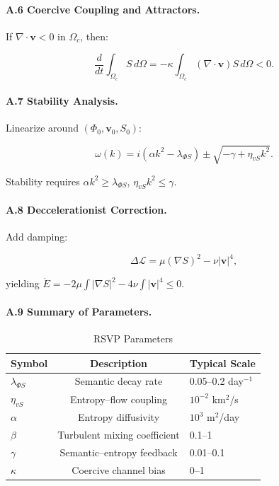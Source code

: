 \documentclass[12pt]{article}
\begin{document}
\paragraph{A.6 Coercive Coupling and Attractors.}

If \(\nabla \cdot \mathbf{v} < 0\) in \(\Omega_c\), then:

\[
\frac{d}{dt} \int_{\Omega_c} S \, d\Omega = -\kappa \int_{\Omega_c} (\nabla \cdot \mathbf{v}) S \, d\Omega < 0.
\]

\paragraph{A.7 Stability Analysis.}

Linearize around \((\Phi_0, \mathbf{v}_0, S_0)\):

\[
\omega(k) = i (\alpha k^2 - \lambda_{\Phi S}) \pm \sqrt{-\gamma + \eta_{vS} k^2}.
\]

Stability requires \(\alpha k^2 \geq \lambda_{\Phi S}\), \(\eta_{vS} k^2 \leq \gamma\).

\paragraph{A.8 Deccelerationist Correction.}

Add damping:

\[
\Delta \mathcal{L} = \mu (\nabla S)^2 - \nu |\mathbf{v}|^4,
\]

yielding \(\dot{E} = -2 \mu \int |\nabla S|^2 - 4 \nu \int |\mathbf{v}|^4 \leq 0\).

\paragraph{A.9 Summary of Parameters.}

\begin{table}[h]
\caption{RSVP Parameters}
\begin{center}
\begin{tabular}{lcl}
\toprule
Symbol & Description & Typical Scale \\
\midrule
\(\lambda_{\Phi S}\) & Semantic decay rate & 0.05–0.2 day\(^{-1}\) \\
\(\eta_{vS}\) & Entropy–flow coupling & \(10^{-2}\) km\(^2\)/s \\
\(\alpha\) & Entropy diffusivity & \(10^3\) m\(^2\)/day \\
\(\beta\) & Turbulent mixing coefficient & 0.1–1 \\
\(\gamma\) & Semantic–entropy feedback & 0.01–0.1 \\
\(\kappa\) & Coercive channel bias & 0–1 \\
\bottomrule
\end{tabular}
\end{center}
\end{table}
\end{document}
